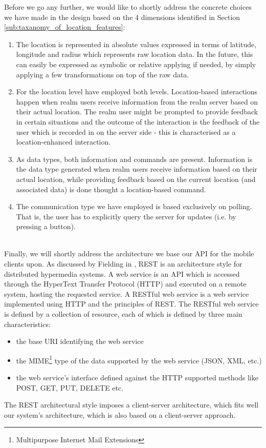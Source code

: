 \noindent Before we go any further, we would like to shortly address the concrete choices we have made in the design based on the 4 dimensions identified in Section \ref{sub:taxanomy_of_location_features}:
\begin{enumerate}
	\item The location is represented in absolute values expressed in terms of latitude, longitude and radius which represents raw location data. In the future, this can easily be expressed as symbolic or relative applying if needed, by simply applying a few transformations on top of the raw data.
	\item For the location level have employed both levels. Location-based interactions happen when realm users receive information from the realm server based on their actual location. The realm user might be prompted to provide feedback in certain situations and the outcome of the interaction is the feedback of the user which is recorded in on the server side - this is characterised as a location-enhanced interaction.
	\item As data types, both information and commands are present. Information is the data type generated when realm users receive information based on their actual location, while providing feedback based on the current location (and associated data) is done thought a location-based command.
	\item The communication type we have employed is based exclusively on polling. That is, the user has to explicitly query the server for updates (i.e. by pressing a button).
\end{enumerate}
\\

\noindent Finally, we will shortly address the architecture we base our API for the mobile clients upon. As discussed by Fielding in \cite{Fielding:2000}, REST is an architecture style for distributed hypermedia systems. A web service is an API which is accessed through the HyperText Transfer Protocol (HTTP) and executed on a remote system, hosting the requested service. A RESTful web service is a web service implemented using HTTP and the principles of REST. The RESTful web service is defined by a collection of resource, each of which is defined by three main characteristics:
\begin{itemize}
  \item the base URI identifying the web service
  \item the MIME\footnote{Multipurpose Internet Mail Extensions} type of the
  data supported by the web service (JSON, XML, etc.)
  \item the web service's interface defined against the HTTP supported methods
  like POST, GET, PUT, DELETE etc.
\end{itemize}
The REST architectural style imposes a client-server architecture, which fits well our system's architecture, which is also based on a client-server approach.

